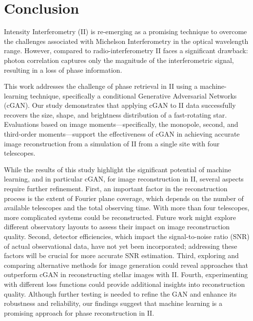 \section{Conclusion}

Intensity Interferometry (II) is re-emerging as a promising technique to overcome the challenges associated with Michelson Interferometry in the optical wavelength range.  However, compared to radio-interferometry II faces a significant drawback: photon correlation captures only the magnitude of the interferometric signal, resulting in a loss of phase information.

This work addresses the challenge of phase retrieval in II using a machine-learning technique, specifically a conditional Generative Adversarial Networks (cGAN). Our study demonstrates that applying cGAN to II data successfully recovers the size, shape, and brightness distribution of a fast-rotating star. Evaluations based on image moments—specifically, the monopole, second, and third-order moments—support the effectiveness of cGAN in achieving accurate image reconstruction from a simulation of II from a single site with four telescopes.  

While the results of this study highlight the significant potential of machine learning, and in particular cGAN, for image reconstruction in II, several aspects require further refinement. First, an important factor in the reconstruction process is the extent of Fourier plane coverage, which depends on the number of available telescopes and the total observing time. With more than four telescopes, more complicated systems could be reconstructed. Future work might explore different observatory layouts to assess their impact on image reconstruction quality.  Second, detector efficiencies, which impact the signal-to-noise ratio (SNR) of actual observational data, have not yet been incorporated; addressing these factors will be crucial for more accurate SNR estimation.  Third, exploring and comparing alternative methods for image generation could reveal approaches that outperform cGAN in reconstructing stellar images with II. Fourth, experimenting with different loss functions could provide additional insights into reconstruction quality. Although further testing is needed to refine the GAN and enhance its robustness and reliability, our findings suggest that machine learning is a promising approach for phase reconstruction in II.
